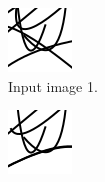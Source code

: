 \begin{figure}
    \centering
    \begin{subfigure}{.2\textwidth}
        \includegraphics[width=\textwidth]{graphics/work-artifacts/iterative/full/3/A/test.png}
        \caption{Input image 1.}
    \end{subfigure}
    \begin{subfigure}{.2\textwidth}
        \includegraphics[width=\textwidth]{graphics/work-artifacts/iterative/full/3/A/test-final.png}

\end{subfigure}
\end{figure}
